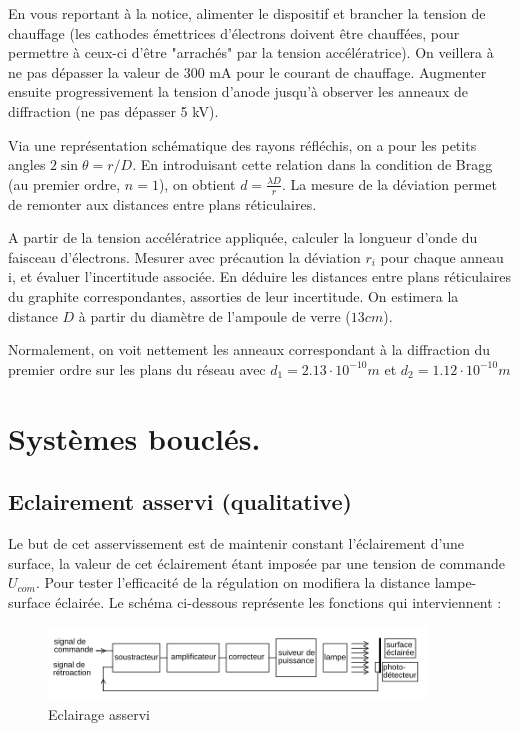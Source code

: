 \documentclass{article}%
\begin{document}
En vous reportant à la notice, alimenter le dispositif et brancher la tension de chauffage (les cathodes émettrices d'électrons doivent être chauffées, pour permettre à ceux-ci d'être "arrachés" par la tension accélératrice). On veillera à ne pas dépasser la valeur de 300 mA pour le courant de chauffage. Augmenter ensuite progressivement la tension d'anode jusqu'à observer les anneaux de diffraction (ne pas dépasser 5 kV).

Via une représentation schématique des rayons réfléchis, on a pour les petits angles $2 \sin \theta = r/D$. En introduisant cette relation dans la condition de Bragg (au premier ordre, $n=1$), on obtient $d=\frac{\lambda D}{r}$. La mesure de la déviation permet de remonter aux distances entre plans réticulaires.

A partir de la tension accélératrice appliquée, calculer la longueur d'onde du faisceau d'électrons. Mesurer avec précaution la déviation $r_i$ pour chaque anneau i, et évaluer l'incertitude associée. En déduire les distances entre plans réticulaires du graphite correspondantes, assorties de leur incertitude. On estimera la distance $D$ à partir du diamètre de l'ampoule de verre ($13 cm$).

Normalement, on voit nettement les anneaux correspondant à la diffraction du premier ordre sur les plans du réseau avec $d_1=2.13\cdot10^{-10}m$ et $d_2=1.12\cdot10^{-10}m$

\section{Systèmes bouclés.}
\subsection{Eclairement asservi (qualitative)}

Le but de cet asservissement est de maintenir constant l'éclairement d'une surface, la valeur de cet éclairement étant imposée par une tension de commande $U_{com}$. Pour tester l'efficacité de la régulation on modifiera la distance lampe-surface éclairée. Le schéma ci-dessous représente les fonctions qui interviennent :
\begin{figure}
	\centerline{\includegraphics[width=10cm]{images-exp/Asservissement_eclair_fonct.png}}
	\caption{Eclairage asservi}
\end{figure}
\end{document}
